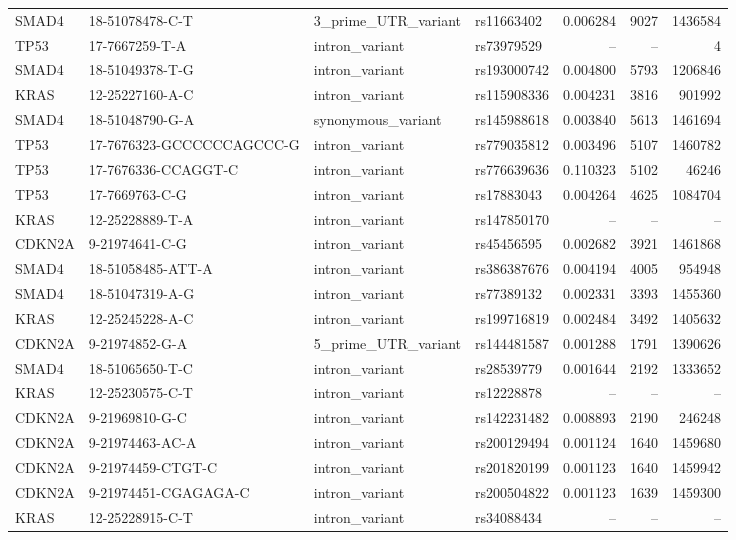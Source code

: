 \begin{footnotesize}
\begin{longtable}{llllrrr}
SMAD4 & 18-51078478-C-T & 3\_prime\_UTR\_variant & rs11663402 & 0.006284 & 9027 & 1436584 \\
TP53 & 17-7667259-T-A & intron\_variant & rs73979529 & -- & -- & 4 \\
SMAD4 & 18-51049378-T-G & intron\_variant & rs193000742 & 0.004800 & 5793 & 1206846 \\
KRAS & 12-25227160-A-C & intron\_variant & rs115908336 & 0.004231 & 3816 & 901992 \\
SMAD4 & 18-51048790-G-A & synonymous\_variant & rs145988618 & 0.003840 & 5613 & 1461694 \\
TP53 & 17-7676323-GCCCCCCAGCCC-G & intron\_variant & rs779035812 & 0.003496 & 5107 & 1460782 \\
TP53 & 17-7676336-CCAGGT-C & intron\_variant & rs776639636 & 0.110323 & 5102 & 46246 \\
TP53 & 17-7669763-C-G & intron\_variant & rs17883043 & 0.004264 & 4625 & 1084704 \\
KRAS & 12-25228889-T-A & intron\_variant & rs147850170 & -- & -- & -- \\
CDKN2A & 9-21974641-C-G & intron\_variant & rs45456595 & 0.002682 & 3921 & 1461868 \\
SMAD4 & 18-51058485-ATT-A & intron\_variant & rs386387676 & 0.004194 & 4005 & 954948 \\
SMAD4 & 18-51047319-A-G & intron\_variant & rs77389132 & 0.002331 & 3393 & 1455360 \\
KRAS & 12-25245228-A-C & intron\_variant & rs199716819 & 0.002484 & 3492 & 1405632 \\
CDKN2A & 9-21974852-G-A & 5\_prime\_UTR\_variant & rs144481587 & 0.001288 & 1791 & 1390626 \\
SMAD4 & 18-51065650-T-C & intron\_variant & rs28539779 & 0.001644 & 2192 & 1333652 \\
KRAS & 12-25230575-C-T & intron\_variant & rs12228878 & -- & -- & -- \\
CDKN2A & 9-21969810-G-C & intron\_variant & rs142231482 & 0.008893 & 2190 & 246248 \\
CDKN2A & 9-21974463-AC-A & intron\_variant & rs200129494 & 0.001124 & 1640 & 1459680 \\
CDKN2A & 9-21974459-CTGT-C & intron\_variant & rs201820199 & 0.001123 & 1640 & 1459942 \\
CDKN2A & 9-21974451-CGAGAGA-C & intron\_variant & rs200504822 & 0.001123 & 1639 & 1459300 \\
KRAS & 12-25228915-C-T & intron\_variant & rs34088434 & -- & -- & -- \\

\end{longtable}
\end{footnotesize}
